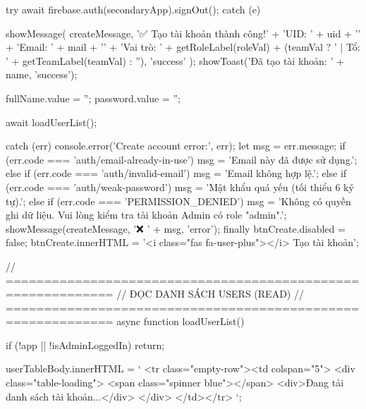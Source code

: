 {{{                    try {
                        await firebase.auth(secondaryApp).signOut();
                    } catch (e) {}

                    showMessage(
                        createMessage,
                        '✅ Tạo tài khoản thành công!\n' +
                        'UID: ' + uid + '\n' +
                        'Email: ' + mail + '\n' +
                        'Vai trò: ' + getRoleLabel(roleVal) + (teamVal ? ' | Tổ: ' + getTeamLabel(teamVal) : ''),
                        'success'
                    );
                    showToast('Đã tạo tài khoản: ' + name, 'success');

                    fullName.value = '';
                    password.value = '';

                    await loadUserList();

                } catch (err) {
                    console.error('Create account error:', err);
                    let msg = err.message;
                    if (err.code === 'auth/email-already-in-use') {
                        msg = 'Email này đã được sử dụng.';
                    } else if (err.code === 'auth/invalid-email') {
                        msg = 'Email không hợp lệ.';
                    } else if (err.code === 'auth/weak-password') {
                        msg = 'Mật khẩu quá yếu (tối thiểu 6 ký tự).';
                    } else if (err.code === 'PERMISSION_DENIED') {
                        msg = 'Không có quyền ghi dữ liệu. Vui lòng kiểm tra tài khoản Admin có role "admin".';
                    }
                    showMessage(createMessage, '❌ ' + msg, 'error');
                } finally {
                    btnCreate.disabled = false;
                    btnCreate.innerHTML = '<i class="fas fa-user-plus"></i> Tạo tài khoản';
                }
            }

            // ============================================================
            // ĐỌC DANH SÁCH USERS (READ)
            // ============================================================
            async function loadUserList() {
                if (!app || !isAdminLoggedIn) return;

                userTableBody.innerHTML = `
                    <tr class="empty-row"><td colspan="5">
                        <div class="table-loading">
                            <span class="spinner blue"></span>
                            <div>Đang tải danh sách tài khoản...</div>
                        </div>
                    </td></tr>
                `;

}}
